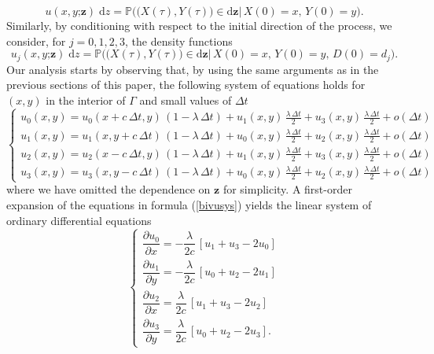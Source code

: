 \documentclass{article}
\begin{document}
\begin{equation}\label{bivu}u(x,y\mathord{;}\mathbf{z})\;\mathrm{d}z=\mathbb{P}\Big(\big(X(\tau),Y(\tau)\big)\in\mathrm{d}\mathbf{z}\Big\lvert\,X(0)=x,\,Y(0)=y\Big).\end{equation}
Similarly, by conditioning with respect to the initial direction of the process, we consider, for $j=0,1,2,3$, the density functions
\begin{equation}\label{bivuj}u_j(x,y\mathord{;}\mathbf{z})\;\mathrm{d}z=\mathbb{P}\Big(\big(X(\tau),Y(\tau)\big)\in\mathrm{d}\mathbf{z}\Big\lvert\,X(0)=x,\,Y(0)=y,\,D(0)=d_j\Big).\end{equation}
Our analysis starts by observing that, by using the same arguments as in the previous sections of this paper, the following system of equations holds for $(x,y)$ in the interior of $\Gamma$ and small values of $\Delta t$
\begin{equation}\label{bivusys}
\begin{cases}
u_0(x,y)=u_0(x+c\,\Delta t,y)\,(1-\lambda\,\Delta t)+u_1(x,y)\,\frac{\lambda\,\Delta t}{2}+u_3(x,y)\,\frac{\lambda\,\Delta t}{2} + o(\Delta t)\\
u_1(x,y)=u_1(x,y+c\,\Delta t)\,(1-\lambda\,\Delta t)+u_0(x,y)\,\frac{\lambda\,\Delta t}{2}+u_2(x,y)\,\frac{\lambda\,\Delta t}{2} + o(\Delta t)\\
u_2(x,y)=u_2(x-c\,\Delta t,y)\,(1-\lambda\,\Delta t)+u_1(x,y)\,\frac{\lambda\,\Delta t}{2}+u_3(x,y)\,\frac{\lambda\,\Delta t}{2} + o(\Delta t)\\
u_3(x,y)=u_3(x,y-c\,\Delta t)\,(1-\lambda\,\Delta t)+u_0(x,y)\,\frac{\lambda\,\Delta t}{2}+u_2(x,y)\,\frac{\lambda\,\Delta t}{2} + o(\Delta t)
\end{cases}\end{equation}
where we have omitted the dependence on $\mathbf{z}$ for simplicity. A first-order expansion of the equations in formula (\ref{bivusys}) yields the linear system of ordinary differential equations
\begin{equation}\label{bivudsys}
\begin{cases}
\dfrac{\partial u_0}{\partial x}=-\dfrac{\lambda}{2c}\,\left[u_1+u_3-2u_0\right]\\[0.75em]
\dfrac{\partial u_1}{\partial y}=-\dfrac{\lambda}{2c}\,\left[u_0+u_2-2u_1\right]\\[0.75em]
\dfrac{\partial u_2}{\partial x}=\dfrac{\lambda}{2c}\,\left[u_1+u_3-2u_2\right]\\[0.75em]
\dfrac{\partial u_3}{\partial y}=\dfrac{\lambda}{2c}\,\left[u_0+u_2-2u_3\right].
\end{cases}\end{equation}
\end{document}
